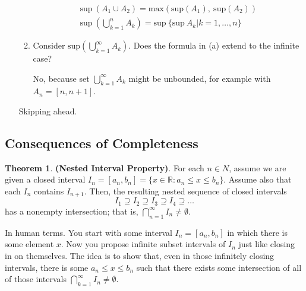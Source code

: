 \documentclass{article}
\numberwithin{equation}{subsection}
\theoremstyle{definition}
\newtheorem{theorem}{Theorem}
\begin{document}
\begin{enumerate}
\begin{enumerate}
            \begin{align*}
                \text{sup}~(A_1 \cup A_2) = \text{max}(\text{sup}(A_1),~\text{sup}(A_2))\\
                \text{sup}~\left(\bigcup_{k=1}^n A_k\right) = \text{sup}~\{\text{sup}~A_k | k = 1,
                \ldots, n \}
            \end{align*}

        \item Consider $\text{sup}(\bigcup_{k=1}^{\infty} A_k)$. Does the formula in (a)
            extend to the infinite case?

            No, because set $\bigcup_{k=1}^{\infty} A_k$ might be unbounded, for example
            with $A_n = [n, n+1]$.

        \end{enumerate}

        Skipping ahead.

\end{enumerate}

\subsection{Consequences of Completeness}

\begin{theorem} \textbf{(Nested Interval Property)}. For each $n \in N$, assume we are
    given a closed interval $I_n = [a_n, b_n] = \{x \in \mathbb{R} : a_n \leq x \leq b_n
    \}$. Assume also that each $I_n$ contains $I_{n+1}$. Then, the resulting nested
    sequence of closed intervals
    \begin{equation*}
        I_1 \supseteq I_2 \supseteq I_3 \supseteq I_4 \supseteq \ldots
    \end{equation*}
    has a nonempty intersection; that is, $\bigcap_{n=1}^{\infty} I_n \neq \emptyset$.

    In human terms. You start with some interval $I_n = [a_n, b_n]$ in which there is some
    element $x$. Now you propose infinite subset intervals of $I_n$ just like closing in
    on themselves. The idea is to show that, even in those infinitely closing intervals,
    there is some $a_n \leq x \leq b_n$ such that there exists some intersection of all of
    those intervals $\bigcap_{k=1}^{\infty} I_n \neq \emptyset$.

\end{theorem}
\end{document}
